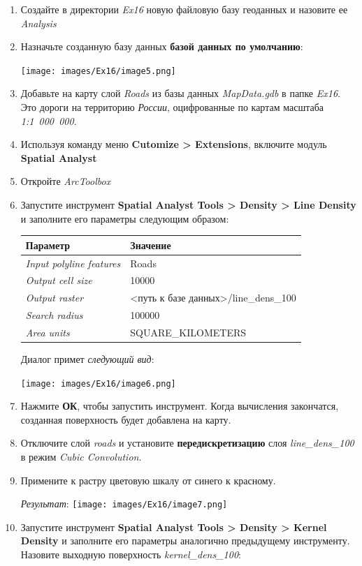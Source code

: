 \documentclass[12pt,]{book}
\begin{document}
\begin{enumerate}
\def\labelenumi{\arabic{enumi}.}
\item
  Создайте в директории \emph{Ex16} новую файловую базу геоданных и назовите ее \emph{Analysis}
\item
  Назначьте созданную базу данных \textbf{базой данных по умолчанию}:

  \texttt{[image: images/Ex16/image5.png]}
\item
  Добавьте на карту слой \emph{Roads} из базы данных \emph{MapData.gdb} в папке \emph{Ex16}. Это дороги на территорию \emph{России}, оцифрованные по картам масштаба \emph{1:1~000~000}.
\item
  Используя команду меню \textbf{Cutomize \textgreater{} Extensions}, включите модуль \textbf{Spatial Analyst}
\item
  Откройте \emph{ArcToolbox}
\item
  Запустите инструмент \textbf{Spatial Analyst Tools \textgreater{} Density \textgreater{} Line Density} и заполните его параметры следующим образом:

  \begin{longtable}[]{@{}ll@{}}
  \toprule
  Параметр & Значение\tabularnewline
  \midrule
  \endhead
  \emph{Input polyline features} & Roads\tabularnewline
  \emph{Output cell size} & 10000\tabularnewline
  \emph{Output raster} & \textless путь к базе данных\textgreater/line\_dens\_100\tabularnewline
  \emph{Search radius} & 100000\tabularnewline
  \emph{Area units} & SQUARE\_KILOMETERS\tabularnewline
  \bottomrule
  \end{longtable}

  Диалог примет \emph{следующий вид}:

  \texttt{[image: images/Ex16/image6.png]}
\item
  Нажмите \textbf{ОК}, чтобы запустить инструмент. Когда вычисления закончатся, созданная поверхность будет добавлена на карту.
\item
  Отключите слой \emph{roads} и установите \textbf{передискретизацию} слоя \emph{line\_dens\_100} в режим \emph{Cubic Convolution}.
\item
  Примените к растру цветовую шкалу от синего к красному.

  \emph{Результат}:
  \texttt{[image: images/Ex16/image7.png]}
\item
  Запустите инструмент \textbf{Spatial Analyst Tools \textgreater{} Density \textgreater{} Kernel Density} и заполните его параметры аналогично предыдущему инструменту. Назовите выходную поверхность \emph{kernel\_dens\_100}:


\end{enumerate}
\end{document}

